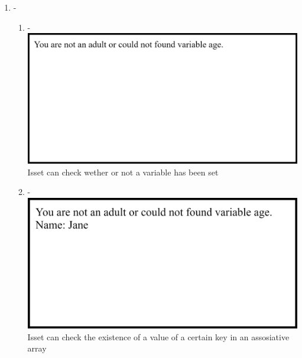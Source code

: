 \documentclass[12pt,titlepage]{article}
\begin{document}
\begin{enumerate}
    \item -
    \begin{enumerate}
        \item - \\ \includegraphics[width=.85\textwidth]{images/figures/fig1.1.png} \\ Isset can check wether or not a variable has been set
        \item - \\ \includegraphics[width=.85\textwidth]{images/figures/fig1.2.png} \\ Isset can check the existence of a value of a certain key in an assosiative array
    \end{enumerate}

    \newpage


\end{enumerate}
\end{document}

